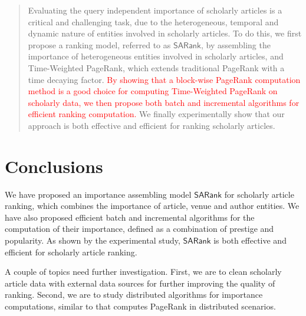 \documentclass[sigconf]{acmart}
\newcommand{\marked}[1]{\textcolor{red}{#1}}
\newcounter{prop}
\newcounter{alg}[section]
\newcommand{\kw}[1]{{\ensuremath {\mathsf{#1}}}\xspace}
\newcommand{\ensemblerank}{\kw{SARank}}
\begin{document}
\begin{abstract}
Evaluating the query independent importance of scholarly articles is a
critical and challenging task, due to the
heterogeneous, temporal and dynamic nature of entities involved in scholarly articles.
To do this, we first propose
a ranking model, referred to as \ensemblerank, by assembling the importance of heterogeneous entities involved in scholarly articles, and  Time-Weighted PageRank, which extends traditional PageRank with a time decaying factor.
\marked{By showing that a block-wise PageRank computation method is a good choice for computing Time-Weighted PageRank on scholarly data, we then propose both batch and incremental algorithms for efficient ranking computation.}
We finally experimentally show that our approach is both effective and efficient for ranking scholarly articles. %
\end{abstract}

\maketitle









\section{Conclusions}
\label{sec-conc}
We have proposed an importance assembling model \ensemblerank for scholarly article ranking,
which combines the importance of article, venue and author entities.
We have also proposed efficient batch and incremental algorithms for the computation of their importance, defined as a combination of prestige and popularity.
As shown by the experimental study, \ensemblerank  is both effective and efficient for scholarly article ranking.


A couple of topics need further investigation. First, we are to clean scholarly article data with external data sources for further improving the quality of ranking. Second, we are to study distributed algorithms for importance computations, similar to \cite{ZhuYL05} that computes PageRank in distributed scenarios.

\end{document}
